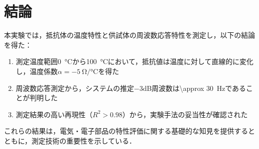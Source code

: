 
\section{結論}

本実験では，抵抗体の温度特性と供試体の周波数応答特性を測定し，以下の結論を得た：

\begin{enumerate}
    \item 測定温度範囲\SI{0}{\celsius}から\SI{100}{\celsius}において，抵抗値は温度に対して直線的に変化し，温度係数$\alpha = \SI{-5}{\ohm\per\celsius}$を得た
    \item 周波数応答測定から，システムの推定$-3$dB周波数は\SI{\approx 30}{\hertz}であることが判明した
    \item 測定結果の高い再現性（$R^2 > 0.98$）から，実験手法の妥当性が確認された
\end{enumerate}

これらの結果は，電気・電子部品の特性評価に関する基礎的な知見を提供するとともに，測定技術の重要性を示している．

